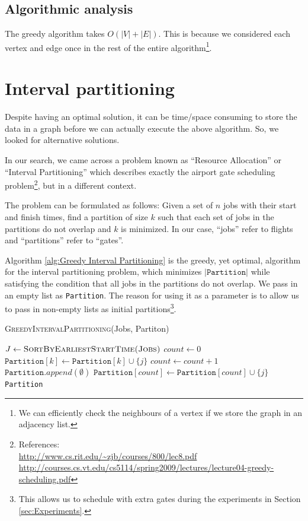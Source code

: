 \documentclass[12pt, a4paper]{report}
\begin{document}
\subsection{Algorithmic analysis}
The greedy algorithm takes $O(|V| + |E|)$.
This is because we considered each vertex and edge once in the rest of the entire algorithm\footnote{We can efficiently check the neighbours of a vertex if we store the graph in an adjacency list.}.

\section{Interval partitioning}
Despite having an optimal solution, it can be time/space consuming to store the data in a graph before we can actually execute the above algorithm. So, we looked for alternative solutions.

In our search, we came across a problem known as ``Resource Allocation'' or ``Interval Partitioning'' which describes exactly the airport gate scheduling problem\footnote{References:\\
\url{http://www.cs.rit.edu/~zjb/courses/800/lec8.pdf}\\
\url{http://courses.cs.vt.edu/cs5114/spring2009/lectures/lecture04-greedy-scheduling.pdf}}, but in a different context.

The problem can be formulated as follows: Given a set of $n$ jobs with their start and finish times, find a partition of size $k$ such that each set of jobs in the partitions do not overlap and $k$ is minimized. In our case, ``jobs'' refer to flights and ``partitions'' refer to ``gates''.

Algorithm \ref{alg:Greedy Interval Partitioning} is the greedy, yet optimal, algorithm for the interval partitioning problem, which minimizes $\vert \texttt{Partition} \vert$ while satisfying the condition that all jobs in the partitions do not overlap. We pass in an empty list as \texttt{Partition}. The reason for using it as a parameter is to allow us to pass in non-empty lists as initial partitions\footnote{This allows us to schedule with extra gates during the experiments in Section \ref{sec:Experiments}.}.

\begin{algorithm}[h!]
\begin{algorithmic}[1]
\caption{\textsc{GreedyIntervalPartitioning}(Jobs, Partiton)}
\label{alg:Greedy Interval Partitioning}
\STATE $J \leftarrow \textsc{SortByEarliestStartTime(Jobs)}$
\STATE $count \leftarrow 0$
	\label{line:Correctness}
		\STATE $\texttt{Partition}[k] \leftarrow \texttt{Partition}[k] \cup \{j\}$
	\ELSE
		\STATE $count \leftarrow count + 1$
		\STATE $\texttt{Partition}.append(\emptyset)$
		\STATE $\texttt{Partition}[count] \leftarrow \texttt{Partition}[count] \cup \{j\}$
	\ENDIF
\ENDFOR
\RETURN \texttt{Partition}
\end{algorithmic}
\end{algorithm}
\end{document}
